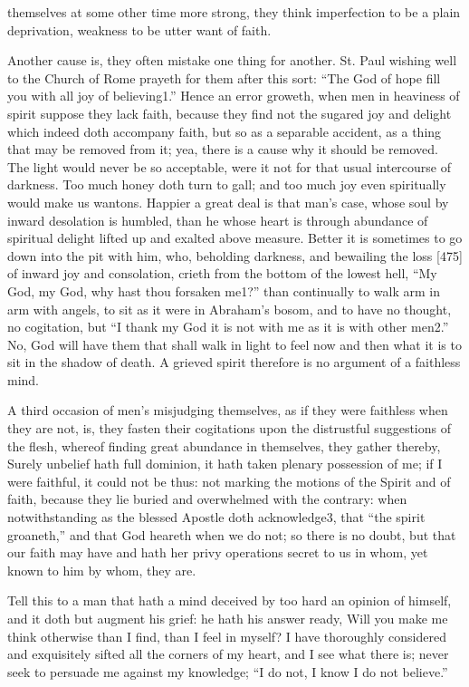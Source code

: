 themselves at some other time more strong, they think imperfection to be a plain deprivation, weakness to be utter want of faith.

Another cause is, they often mistake one thing for another. St. Paul wishing well to the Church of Rome prayeth for them after this sort: “The God of hope fill you with all joy of believing1.” Hence an error groweth, when men in heaviness of spirit suppose they lack faith, because they find not the sugared joy and delight which indeed doth accompany faith, but so as a separable accident, as a thing that may be removed from it; yea, there is a cause why it should be removed. The light would never be so acceptable, were it not for that usual intercourse of darkness. Too much honey doth turn to gall; and too much joy even spiritually would make us wantons. Happier a great deal is that man’s case, whose soul by inward desolation is humbled, than he whose heart is through abundance of spiritual delight lifted up and exalted above measure. Better it is sometimes to go down into the pit with him, who, beholding darkness, and bewailing the loss [475] of inward joy and consolation, crieth from the bottom of the lowest hell, “My God, my God, why hast thou forsaken me1?” than continually to walk arm in arm with angels, to sit as it were in Abraham’s bosom, and to have no thought, no cogitation, but “I thank my God it is not with me as it is with other men2.” No, God will have them that shall walk in light to feel now and then what it is to sit in the shadow of death. A grieved spirit therefore is no argument of a faithless mind.

A third occasion of men’s misjudging themselves, as if they were faithless when they are not, is, they fasten their cogitations upon the distrustful suggestions of the flesh, whereof finding great abundance in themselves, they gather thereby, Surely unbelief hath full dominion, it hath taken plenary possession of me; if I were faithful, it could not be thus: not marking the motions of the Spirit and of faith, because they lie buried and overwhelmed with the contrary: when notwithstanding as the blessed Apostle doth acknowledge3, that “the spirit groaneth,” and that God heareth when we do not; so there is no doubt, but that our faith may have and hath her privy operations secret to us in whom, yet known to him by whom, they are.

Tell this to a man that hath a mind deceived by too hard an opinion of himself, and it doth but augment his grief: he hath his answer ready, Will you make me think otherwise than I find, than I feel in myself? I have thoroughly considered and exquisitely sifted all the corners of my heart, and I see what there is; never seek to persuade me against my knowledge; “I do not, I know I do not believe.”

